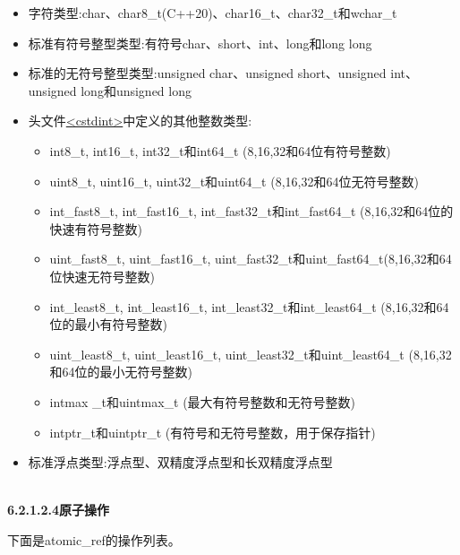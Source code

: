 \begin{itemize}
\item 
字符类型:char、char8\_t(C++20)、char16\_t、char32\_t和wchar\_t

\item 
标准有符号整型类型:有符号char、short、int、long和long long

\item 
标准的无符号整型类型:unsigned char、unsigned short、unsigned int、unsigned long和unsigned long

\item 
头文件\href{http://en.cppreference.com/w/cpp/header/cstdint}{<cstdint>}中定义的其他整数类型:
\begin{itemize}
\item 
int8\_t, int16\_t, int32\_t和int64\_t (8,16,32和64位有符号整数)

\item 
uint8\_t, uint16\_t, uint32\_t和uint64\_t (8,16,32和64位无符号整数)

\item 
int\_fast8\_t, int\_fast16\_t, int\_fast32\_t和int\_fast64\_t (8,16,32和64位的快速有符号整数)

\item 
uint\_fast8\_t, uint\_fast16\_t, uint\_fast32\_t和uint\_fast64\_t(8,16,32和64位快速无符号整数)

\item 
int\_least8\_t, int\_least16\_t, int\_least32\_t和int\_least64\_t (8,16,32和64位的最小有符号整数)

\item 
uint\_least8\_t, uint\_least16\_t, uint\_least32\_t和uint\_least64\_t (8,16,32和64位的最小无符号整数)

\item 
intmax \_t和uintmax\_t (最大有符号整数和无符号整数)

\item 
intptr\_t和uintptr\_t (有符号和无符号整数，用于保存指针)
\end{itemize}

\item 
标准浮点类型:浮点型、双精度浮点型和长双精度浮点型
\end{itemize}

\hspace*{\fill} \\ %
\noindent
\textbf{6.2.1.2.4\hspace{0.2cm}原子操作}

下面是atomic\_ref的操作列表。

